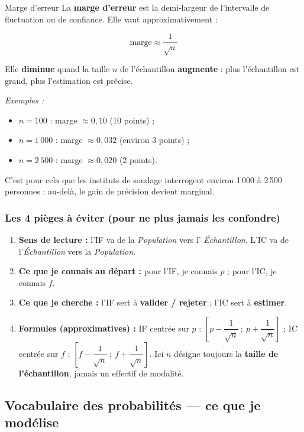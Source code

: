 \documentclass[11pt,a4paper]{article}
\begin{document}
	\begin{ficheoutils}{Marge d'erreur}
		La \textbf{marge d'erreur} est la demi-largeur de l'intervalle de fluctuation ou
		de confiance. Elle vaut approximativement :
		\begin{formule}
			\[ \text{marge} \approx \dfrac{1}{\sqrt{n}} \]
		\end{formule}
		Elle \textbf{diminue} quand la taille $n$ de l'échantillon \textbf{augmente} :
		plus l'échantillon est grand, plus l'estimation est précise.
		
		\emph{Exemples :}
		\begin{itemize}
			\item $n = 100$ : marge $\approx 0{,}10$ (10 points) ;
			\item $n = 1\,000$ : marge $\approx 0{,}032$ (environ 3 points) ;
			\item $n = 2\,500$ : marge $\approx 0{,}020$ (2 points).
		\end{itemize}
		C'est pour cela que les instituts de sondage interrogent environ 1\,000 à
		2\,500 personnes : au-delà, le gain de précision devient marginal.
	\end{ficheoutils}
	
	\subsubsection{Les 4 pièges à éviter (pour ne plus jamais les confondre)}
	
	\begin{enumerate}[leftmargin=*]
		\item \textbf{Sens de lecture :} l'IF va de la \emph{Population} vers l'
		\emph{Échantillon}. L'IC va de l'\emph{Échantillon} vers la
		\emph{Population}.
		\item \textbf{Ce que je connais au départ :} pour l'IF, je connais $p$ ;
		pour l'IC, je connais $f$.
		\item \textbf{Ce que je cherche :} l'IF sert à \textbf{valider / rejeter} ;
		l'IC sert à \textbf{estimer}.
		\item \textbf{Formules (approximatives) :} IF centrée sur $p$ :
		$\left[p - \dfrac{1}{\sqrt{n}}\ ;\ p + \dfrac{1}{\sqrt{n}}\right]$ ;
		IC centrée sur $f$ :
		$\left[f - \dfrac{1}{\sqrt{n}}\ ;\ f + \dfrac{1}{\sqrt{n}}\right]$.
		Ici $n$ désigne toujours la \textbf{taille de l'échantillon}, jamais un
		effectif de modalité.
	\end{enumerate}
	
	\subsection{Vocabulaire des probabilités — ce que je modélise}
	
\end{document}
